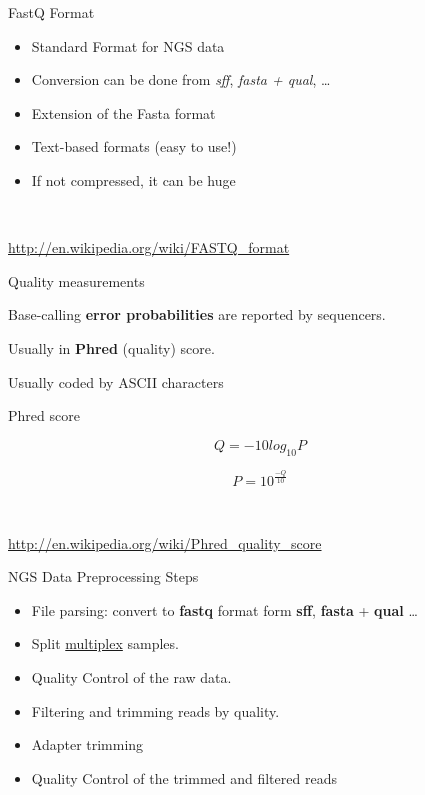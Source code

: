 \documentclass{beamer}
\title[{\makebox[.45\paperwidth]{\titulocorto \hfill \insertframenumber/\inserttotalframenumber}}]{\titulolargo}
\subtitle{{\color{gray}\subtitulo}}  %
\author[\autorcorto]{\autorlargo}
\date{\fecha \newline \newline \url{\pagina}}
\begin{document}
\begin{frame}
  \maketitle
\end{frame}

\begin{frame}{FastQ Format}

\begin{itemize}
\itemsep1pt\parskip0pt
\item
  Standard Format for NGS data
\item
  Conversion can be done from \emph{sff}, \emph{fasta + qual}, \ldots{}
\item
  Extension of the Fasta format
\item
  Text-based formats (easy to use!)
\item
  If not compressed, it can be huge
\end{itemize}

~

\url{http://en.wikipedia.org/wiki/FASTQ_format}

\end{frame}

\begin{frame}{Quality measurements}

Base-calling \textbf{error probabilities} are reported by sequencers.

Usually in \textbf{Phred} (quality) score.

Usually coded by ASCII characters

\begin{block}{Phred score}

\[Q = -10 log_{10} P\]

\[P = 10^{\frac{-Q}{10}}\]

~

\href{http://en.wikipedia.org/wiki/Phred_quality_score\#Definition}{http://en.wikipedia.org/wiki/Phred\_quality\_score}

\end{block}

\end{frame}

\begin{frame}{NGS Data Preprocessing Steps}

\begin{itemize}
\item
  File parsing: convert to \textbf{fastq} format form \textbf{sff},
  \textbf{fasta} + \textbf{qual} \ldots{}
\item
  Split
  \href{http://www.illumina.com/technology/multiplexing_sequencing_assay.ilmn}{multiplex}
  samples.
\item
  Quality Control of the raw data.
\item
  Filtering and trimming reads by quality.
\item
  Adapter trimming
\item
  Quality Control of the trimmed and filtered reads
\end{itemize}

\end{frame}
\end{document}
